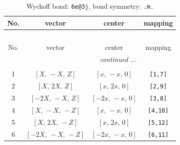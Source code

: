 \documentclass[fleqn,8pt]{jsarticle}
\begin{document}
\renewcommand{\arraystretch}{1.2}
\begin{longtable}{cccc}
\caption{Wyckoff bond: {\tt 6e@3j}, bond symmetry: {\tt .m.}}
 \\
 \hline \hline
No. & vector & center & mapping \\ \hline \endfirsthead

\multicolumn{3}{l}{\tablename\ \thetable{}} \\
 \hline \hline
No. & vector & center & mapping \\ \hline \endhead

 \hline \hline
\multicolumn{3}{r}{\footnotesize\it continued ...} \\ \endfoot

 \hline \hline
\multicolumn{3}{r}{} \\ \endlastfoot

1 & $\left[ X,\, - X,\, Z \right]$ & $\left[ x,\, - x,\, 0 \right]$ & {\tt [1,7]} \\ \hline
2 & $\left[ X,\, 2 X,\, Z \right]$ & $\left[ x,\, 2 x,\, 0 \right]$ & {\tt [2,9]} \\ \hline
3 & $\left[ - 2 X,\, - X,\, Z \right]$ & $\left[ - 2 x,\, - x,\, 0 \right]$ & {\tt [3,8]} \\ \hline
4 & $\left[ X,\, - X,\, - Z \right]$ & $\left[ x,\, - x,\, 0 \right]$ & {\tt [4,10]} \\ \hline
5 & $\left[ X,\, 2 X,\, - Z \right]$ & $\left[ x,\, 2 x,\, 0 \right]$ & {\tt [5,12]} \\ \hline
6 & $\left[ - 2 X,\, - X,\, - Z \right]$ & $\left[ - 2 x,\, - x,\, 0 \right]$ & {\tt [6,11]} \\
\end{longtable}
\renewcommand{\arraystretch}{1.2}
\end{document}
